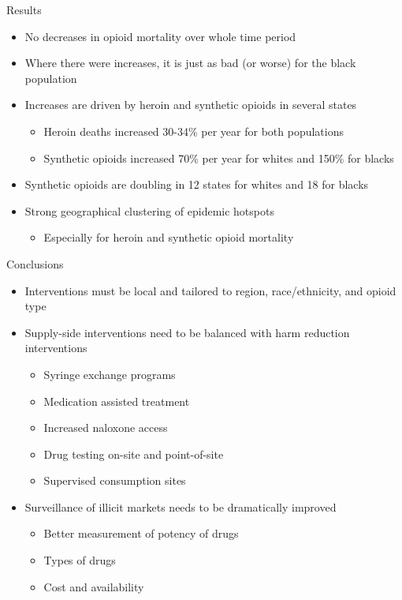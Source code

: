 \documentclass[ignorenonframetext,compress]{beamer}
\providecommand{\tightlist}{%
  \setlength{\itemsep}{0pt}\setlength{\parskip}{0pt}}
\begin{document}
\begin{frame}{Results}

\begin{itemize}[<+->]
\tightlist
\item
  No decreases in opioid mortality over whole time period
\item
  Where there were increases, it is just as bad (or worse) for the black
  population
\item
  Increases are driven by heroin and synthetic opioids in several states

  \begin{itemize}[<+->]
  \tightlist
  \item
    Heroin deaths increased 30-34\% per year for both populations
  \item
    Synthetic opioids increased 70\% per year for whites and 150\% for
    blacks
  \end{itemize}
\item
  Synthetic opioids are doubling in 12 states for whites and 18 for
  blacks
\item
  Strong geographical clustering of epidemic hotspots

  \begin{itemize}[<+->]
  \tightlist
  \item
    Especially for heroin and synthetic opioid mortality
  \end{itemize}
\end{itemize}

\end{frame}

\begin{frame}{Conclusions}

\begin{itemize}[<+->]
\tightlist
\item
  Interventions must be local and tailored to region, race/ethnicity,
  and opioid type
\item
  Supply-side interventions need to be balanced with harm reduction
  interventions

  \begin{itemize}[<+->]
  \tightlist
  \item
    Syringe exchange programs
  \item
    Medication assisted treatment
  \item
    Increased naloxone access
  \item
    Drug testing on-site and point-of-site
  \item
    Supervised consumption sites
  \end{itemize}
\item
  Surveillance of illicit markets needs to be dramatically improved

  \begin{itemize}[<+->]
  \tightlist
  \item
    Better measurement of potency of drugs
  \item
    Types of drugs
  \item
    Cost and availability
  \end{itemize}
\end{itemize}

\end{frame}
\end{document}
